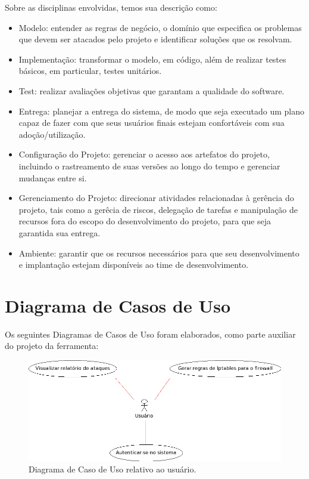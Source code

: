 Sobre as disciplinas envolvidas, temos sua descrição como:
\begin{itemize}
    \item Modelo: entender as regras de negócio, o domínio que especifica os problemas que devem ser atacados pelo projeto e identificar soluções que os resolvam.

    \item Implementação: transformar o modelo, em código, além de realizar testes básicos, em particular, testes unitários.

    \item Test: realizar avaliações objetivas que garantam a qualidade do software.

    \item Entrega: planejar a entrega do sistema, de modo que seja executado um plano capaz de fazer com que seus usuários finais estejam confortáveis com sua adoção/utilização.

    \item Configuração do Projeto: gerenciar o acesso aos artefatos do projeto, incluindo o rastreamento de suas versões ao longo do tempo e gerenciar mudanças entre si.

    \item Gerenciamento do Projeto: direcionar atividades relacionadas à gerência do projeto, tais como a gerêcia de riscos, delegação de tarefas e manipulação de recursos fora do escopo do desenvolvimento do projeto, para que seja garantida sua entrega.

    \item Ambiente: garantir que os recursos necessários para que seu desenvolvimento e implantação estejam disponíveis ao time de desenvolvimento.
\end{itemize}

\clearpage
\section{Diagrama de Casos de Uso}

Os seguintes Diagramas de Casos de Uso foram elaborados, como parte auxiliar do projeto da ferramenta:

\vspace{2.5 cm}

\begin{figure}[ht]
    \begin{center}
        \includegraphics[scale=0.8]{./figuras/casoUsoUsuario.png}

        \caption{Diagrama de Caso de Uso relativo ao usuário.}
    \end{center}
\end{figure}

